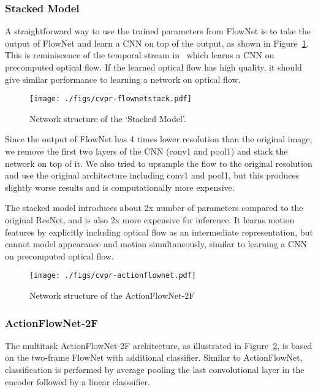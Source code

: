 \documentclass[10pt,twocolumn,letterpaper]{article}
\begin{document}
\subsubsection{Stacked Model}
A straightforward way to use the trained parameters from FlowNet is to take the output of FlowNet and learn a CNN on top of the output, as shown in Figure~\ref{fig:stacked_archi}.
This is reminiscence of the temporal stream in~\cite{simonyanZ14a} which learns a CNN on precomputed optical flow.
If the learned optical flow has high quality, it should give similar performance to learning a network on optical flow.

\begin{figure}[h!]
\centering
\texttt{[image: ./figs/cvpr-flownetstack.pdf]}	
  \caption{Network structure of the `Stacked Model'.}
	\label{fig:stacked_archi}
  \vspace{-.5em}
\end{figure}



Since the output of FlowNet has 4 times lower resolution than the original image, we remove the first two layers of the CNN (conv1 and pool1) and stack the network on top of it.
We also tried to upsample the flow to the original resolution and use the original architecture including conv1 and pool1, but this produces slightly worse results and is computationally more expensive.

The stacked model introduces about 2x number of parameters compared to the original ResNet, and is also 2x more expensive for inference.
It learns motion features by explicitly including optical flow as an intermediate representation, but cannot model appearance and motion simultaneously, similar to learning a CNN on precomputed optical flow.

\begin{figure}[th!]
\centering
\texttt{[image: ./figs/cvpr-actionflownet.pdf]}	
	\caption{Network structure of the ActionFlowNet-2F}
	\vspace{-2em}
	\label{fig:mt_archi}
\end{figure}

\subsubsection{ActionFlowNet-2F}
The multitask ActionFlowNet-2F architecture, as illustrated in Figure~\ref{fig:mt_archi}, is based on the two-frame FlowNet with additional classifier. 
Similar to ActionFlowNet, classification is performed by average pooling the last convolutional layer in the encoder followed by a linear classsifier.
\end{document}
